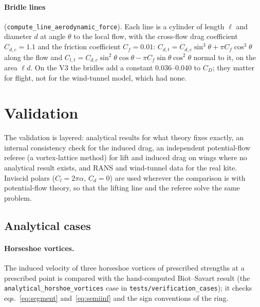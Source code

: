 \documentclass[11pt,a4paper]{article}
\newcommand{\code}[1]{\texttt{#1}}
\begin{document}
\paragraph{Bridle lines} (\code{compute\_line\_aerodynamic\_force}). Each line is a cylinder of length $\ell$ and diameter $d$ at angle $\theta$ to the local flow, with the cross-flow drag coefficient $C_{d,c}=1.1$ and the friction coefficient $C_f=0.01$: $C_{d,t}=C_{d,c}\sin^3\theta+\pi C_f\cos^3\theta$ along the flow and $C_{l,t}=C_{d,c}\sin^2\theta\cos\theta-\pi C_f\sin\theta\cos^2\theta$ normal to it, on the area $\ell d$. On the V3 the bridles add a constant $0.036$--$0.040$ to $C_D$; they matter for flight, not for the wind-tunnel model, which had none.

\section{Validation}
\label{sec:validation}
The validation is layered: analytical results for what theory fixes exactly, an internal consistency check for the induced drag, an independent potential-flow referee (a vortex-lattice method) for lift and induced drag on wings where no analytical result exists, and RANS and wind-tunnel data for the real kite. Inviscid polars ($C_l=2\pi\alpha$, $C_d=0$) are used wherever the comparison is with potential-flow theory, so that the lifting line and the referee solve the same problem.

\subsection{Analytical cases}
\label{sec:val-analytical}
\paragraph{Horseshoe vortices.} The induced velocity of three horseshoe vortices of prescribed strengths at a prescribed point is compared with the hand-computed Biot--Savart result (the \code{analytical\_horshoe\_vortices} case in \code{tests/verification\_cases}); it checks eqs.~\eqref{eq:segment} and~\eqref{eq:semiinf} and the sign conventions of the ring.
\end{document}
